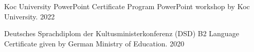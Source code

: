 
\begin{cvhonors}

  \cvhonor
    {Koc University PowerPoint Certificate Program}
    {PowerPoint workshop by Koc University.}
    {}
    {2022}

  \cvhonor
    {Deutsches Sprachdiplom der Kultusministerkonferenz (DSD) B2}
    {Language Certificate given by German Ministry of Education.}
    {}
    {2020}

\end{cvhonors}

